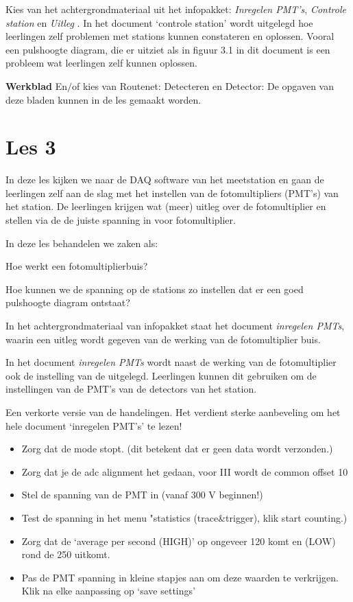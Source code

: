 Kies van het achtergrondmateriaal uit het infopakket: \textit{Inregelen
PMT's}, \textit{Controle station} en \textit{Uitleg \hisparc}. In het
document `controle station' wordt uitgelegd hoe leerlingen zelf
problemen met stations kunnen constateren en oplossen. Vooral een
pulshoogte diagram, die er uitziet als in figuur 3.1 in dit document is
een probleem wat leerlingen zelf kunnen oplossen.

\textbf{Werkblad}
En$/$of kies van Routenet:
Detecteren en Detector:
De opgaven van deze bladen kunnen in de les gemaakt worden.

\section{Les 3}
In deze les kijken we naar de DAQ software van het meetstation en gaan de leerlingen
zelf aan de slag met het instellen van de fotomultipliers (PMT's) van het station.
De leerlingen krijgen wat (meer) uitleg over de fotomultiplier en stellen via de \hisparc \daq
de juiste spanning in voor fotomultiplier.

In deze les behandelen we zaken als:
\begin{description}
    \item{Hoe werkt een fotomultiplierbuis?}
    \item{Hoe kunnen we de spanning op de stations zo instellen dat er een
    goed pulshoogte diagram ontstaat?}
\end{description}

In het achtergrondmateriaal van infopakket staat het document \textit{inregelen PMTs},
waarin een uitleg wordt gegeven van de werking van de fotomultiplier buis.


In het document \textit{inregelen PMTs} wordt naast de werking van de fotomultiplier
ook de instelling van de \hisparc \daq uitgelegd. Leerlingen kunnen dit gebruiken om
de instellingen van de PMT's van de detectors van het \hisparc station.

Een verkorte versie van de handelingen. Het verdient sterke aanbeveling om het hele
document `inregelen PMT's' te lezen!
\begin{itemize}
    \item Zorg dat de \daq mode stopt. (dit betekent dat er geen data wordt verzonden.)
    \item Zorg dat je de adc alignment het gedaan, voor \hisparc III \daq wordt de common offset
    10
    \item Stel de spanning van de PMT in (vanaf 300 V beginnen!)
    \item Test de spanning in het menu "statistics (trace\&trigger), klik start counting.)
    \item Zorg dat de `average per second (HIGH)' op ongeveer 120 komt en (LOW) rond de 250 uitkomt.
    \item Pas de PMT spanning in kleine stapjes aan om deze waarden te verkrijgen. Klik na elke aanpassing op `save settings'
\end{itemize}

